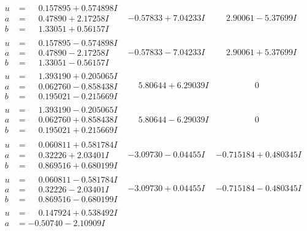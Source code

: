 \documentclass[1p]{elsarticle_modified}
\theoremstyle{definition}
\begin{document}
$$\begin{array}{c|c|c}
\begin{aligned}
u &= \phantom{-}0.157895 + 0.574898 I \\
a &= \phantom{-}0.47890 + 2.17258 I \\
b &= \phantom{-}1.33051 + 0.56157 I\end{aligned}
 & -0.57833 + 7.04233 I & \phantom{-}2.90061 - 5.37699 I \\ \hline\begin{aligned}
u &= \phantom{-}0.157895 - 0.574898 I \\
a &= \phantom{-}0.47890 - 2.17258 I \\
b &= \phantom{-}1.33051 - 0.56157 I\end{aligned}
 & -0.57833 - 7.04233 I & \phantom{-}2.90061 + 5.37699 I \\ \hline\begin{aligned}
u &= \phantom{-}1.393190 + 0.205065 I \\
a &= \phantom{-}0.062760 - 0.858438 I \\
b &= \phantom{-}0.195021 - 0.215669 I\end{aligned}
 & \phantom{-}5.80644 + 6.29039 I & \phantom{-0.000000 } 0 \\ \hline\begin{aligned}
u &= \phantom{-}1.393190 - 0.205065 I \\
a &= \phantom{-}0.062760 + 0.858438 I \\
b &= \phantom{-}0.195021 + 0.215669 I\end{aligned}
 & \phantom{-}5.80644 - 6.29039 I & \phantom{-0.000000 } 0 \\ \hline\begin{aligned}
u &= \phantom{-}0.060811 + 0.581784 I \\
a &= \phantom{-}0.32226 + 2.03401 I \\
b &= \phantom{-}0.869516 + 0.680199 I\end{aligned}
 & -3.09730 - 0.04455 I & -0.715184 + 0.480345 I \\ \hline\begin{aligned}
u &= \phantom{-}0.060811 - 0.581784 I \\
a &= \phantom{-}0.32226 - 2.03401 I \\
b &= \phantom{-}0.869516 - 0.680199 I\end{aligned}
 & -3.09730 + 0.04455 I & -0.715184 - 0.480345 I \\ \hline\begin{aligned}
u &= \phantom{-}0.147924 + 0.538492 I \\
a &= -0.50740 - 2.10909 I \\

\end{aligned}
\end{array}$$
\end{document}
